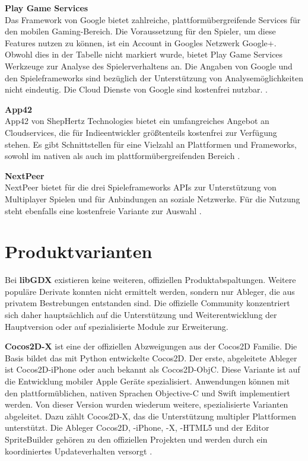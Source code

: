 \bigskip
\textbf{Play Game Services} \\
Das Framework von Google bietet zahlreiche, plattformübergreifende Services für den mobilen Gaming-Bereich. Die Voraussetzung für den Spieler, um diese Features nutzen zu können, ist ein Account in Googles Netzwerk Google+. Obwohl dies in der Tabelle nicht markiert wurde, bietet Play Game Services Werkzeuge zur Analyse des Spielerverhaltens an. Die Angaben von Google und den Spieleframeworks sind bezüglich der Unterstützung von Analysemöglichkeiten nicht eindeutig. Die Cloud Dienste von Google sind kostenfrei nutzbar. \citep{play_game_services}. 

\bigskip
\textbf{App42} \\
App42 von ShepHertz Technologies bietet ein umfangreiches Angebot an Cloudservices, die für Indieentwickler größtenteils kostenfrei zur Verfügung stehen. Es gibt Schnittstellen für eine Vielzahl an Plattformen und Frameworks, sowohl im nativen als auch im plattformübergreifenden Bereich \citep{app42}.

\bigskip
\textbf{NextPeer} \\
NextPeer bietet für die drei Spieleframeworks APIs zur Unterstützung von Multiplayer Spielen und für Anbindungen an soziale Netzwerke. Für die Nutzung steht ebenfalls eine kostenfreie Variante zur Auswahl \citep{nextpeer}.

\section{Produktvarianten}
Bei \textbf{libGDX} existieren keine weiteren, offiziellen Produktabspaltungen. Weitere populäre Derivate konnten nicht ermittelt werden, sondern nur Ableger, die aus privatem Bestrebungen entstanden sind. Die offizielle Community konzentriert sich daher hauptsächlich auf die Unterstützung und Weiterentwicklung der Hauptversion oder auf spezialisierte Module zur Erweiterung.

\bigskip
\textbf{Cocos2D-X} ist eine der offiziellen Abzweigungen aus der Cocos2D Familie. Die Basis bildet das mit Python entwickelte Cocos2D. Der erste, abgeleitete Ableger ist Cocos2D-iPhone oder auch bekannt als Cocos2D-ObjC. Diese Variante ist auf die Entwicklung mobiler Apple Geräte spezialisiert. Anwendungen können mit den plattformüblichen, nativen Sprachen Objective-C und Swift implementiert werden. Von dieser Version wurden wiederum weitere, spezialisierte Varianten abgeleitet. Dazu zählt Cocos2D-X, das die Unterstützung multipler Plattformen unterstützt. Die Ableger Cocos2D, -iPhone, -X, -HTML5 und der Editor SpriteBuilder gehören zu den offiziellen Projekten und werden durch ein koordiniertes Updateverhalten versorgt \citep{cocos2d_relationships}. 

